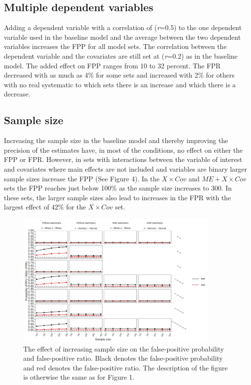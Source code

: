 \subsection{Multiple dependent variables}
Adding a dependent variable with a correlation of (\textit{r}=0.5) to the one dependent variable used in the baseline model and the average between the two dependent variables increases the FPP for all model sets. The correlation between the dependent variable and the covariates are still set at (\textit{r}=0.2) as in the baseline model. The added effect on FPP ranges from 10 to 32 percent. The FPR decreased with as much as 4\% for some sets and increased with 2\% for others with no real systematic to which sets there is an increase and which there is a decrease.  


\subsection{Sample size}
Increasing the sample size in the baseline model and thereby improving the precision of the estimates have, in most of the conditions, no effect on either the FPP or FPR. However, in sets with interactions between the variable of interest and covariates where main effects are not included and variables are binary larger sample sizes increase the FPP (See Figure 4). In the $X \times Cov$ and $ME + X \times Cov$ sets the FPP reaches just below 100\% as the sample size increases to 300. In these sets, the larger sample sizes also lead to increases in the FPR with the largest effect of 42\% for the $X \times Cov$ set.  


\begin{figure}[hbt!]
\includegraphics[width=0.9\textwidth]{R/Analysis/Result/Figures/Figure1D.jpeg}
\centering
\caption{The effect of increasing sample size on the false-positive probability and false-positive ratio. Black denotes the false-positive probability and red denotes the false-positive ratio. The description of the figure is otherwise the same as for Figure 1.}
\label{fig:mainfigure}
\end{figure}

